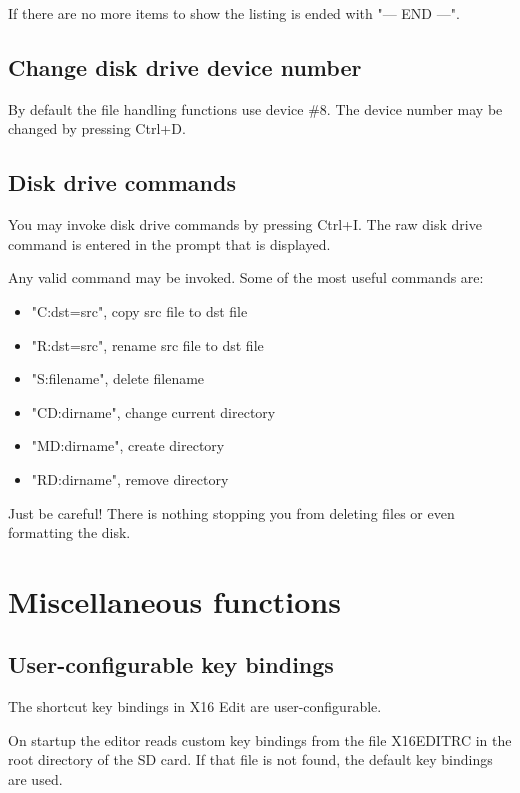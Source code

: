 \documentclass{article}
\begin{document}
        If there are no more items to show the listing is ended with "--- END ---".

    \subsection{Change disk drive device number}
        By default the file handling functions use device \#8. The device
        number may be changed by pressing Ctrl+D.

    \subsection{Disk drive commands}
        You may invoke disk drive commands by pressing Ctrl+I. The raw disk drive command
        is entered in the prompt that is displayed.

        Any valid command may be invoked. Some of the most useful commands are:

     \begin{itemize} 
            \item "C:dst=src", copy src file to dst file
            \item "R:dst=src", rename src file to dst file
            \item "S:filename", delete filename
            \item "CD:dirname", change current directory
            \item "MD:dirname", create directory
            \item "RD:dirname", remove directory
    \end{itemize}
    
        Just be careful! There is nothing stopping you from deleting files or even formatting the
        disk.

\section{Miscellaneous functions}

    \subsection{User-configurable key bindings}
        The shortcut key bindings in X16 Edit are user-configurable.

        On startup the editor reads custom key bindings from the file X16EDITRC in the root directory
        of the SD card. If that file is not found, the default key bindings are
        used.
        
\end{document}
